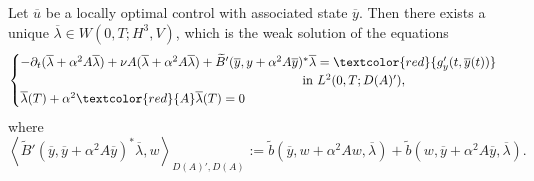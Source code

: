 \documentclass[reqno]{amsart}
\begin{document}
	\begin{lemma}\label{adj_wellposedness}
		Let $\overline{u}$ be a locally optimal control with associated state $\overline{y}$. Then there exists a unique $\overline{\lambda} \in W(0,T;H^3,V)$, which is the weak solution of the equations
		\begin{align}\label{adj_eqt}
			\begin{split}
				\begin{cases}
					- \partial_t(\overline{\lambda}+\alpha^2A\overline{\lambda})+\nu A (\overline{\lambda}+ \alpha^2 A \overline{\lambda}) +\widetilde{B}'(\overline{y},y+\alpha^2A\overline{y})^*\overline{\lambda} = \textcolor{red}{g'_y(t,\overline{y}(t))} \\ \hspace{220pt}\text{ in }L^2(0,T;D(A)'),\\
					\overline{\lambda}(T) + \alpha^2 \textcolor{red}{A}\overline{\lambda}(T) = 0
				\end{cases}
			\end{split}
		\end{align}
		where $\left \langle \widetilde{B}'(\overline{y},\overline{y}+\alpha^2A\overline{y})^*\overline{\lambda}, w \right \rangle_{D(A)',D(A)}:=\tilde{b}(\overline{y},w+\alpha^2Aw,\overline{\lambda})+\tilde{b}(w,\overline{y}+\alpha^2A\overline{y},\overline{\lambda}).$
	\end{lemma}
\end{document}
